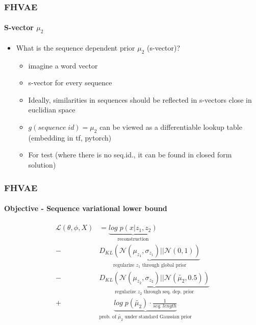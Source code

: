 \documentclass[9pt]{beamer}
\begin{document}
\begin{frame}
\frametitle{FHVAE}
\framesubtitle{S-vector $\mu_2$}
\begin{itemize}
	\item What is the sequence dependent prior $\mu_2$ (s-vector)?
	\begin{itemize}
		\item imagine a word vector 
		\item s-vector for every sequence
		\item Ideally, similarities in sequences should be reflected in s-vectors close in euclidian space
		\item $g(sequence\;id) = \mu_2$ can be viewed as a differentiable lookup table (embedding in tf, pytorch)
		\item For test (where there is no seq.id., it can be found in closed form solution)
	\end{itemize}
\end{itemize}
\end{frame} 



\begin{frame}
\frametitle{FHVAE}
\framesubtitle{Objective - Sequence variational lower bound}
\begin{align*}
\mathcal{L}(\theta, \phi, X)& = %
\underbrace{log\;p(x|z_1, z_2)}_{\text{reconstruction}}\\%
-&\underbrace{D_{KL}(\mathcal{N}(\mu_{z_1}, \sigma_{z_1})||\mathcal{N}(0,1))}_{\text{regularize $z_1$ through global prior}}\\
-&\underbrace{D_{KL}(\mathcal{N}(\mu_{z_2}, \sigma_{z_2})||\mathcal{N}(\tilde{\mu_2},0.5))}_{\text{regularize $z_2$ through seq. dep. prior}}\\
+&\underbrace{log\;p(\tilde{\mu_2}) \cdot \frac{1}{seq.\;length}}_{\text{prob. of $\tilde{\mu_2}$ under standard Gaussian prior}}
\end{align*}
\end{frame} 
\end{document}
